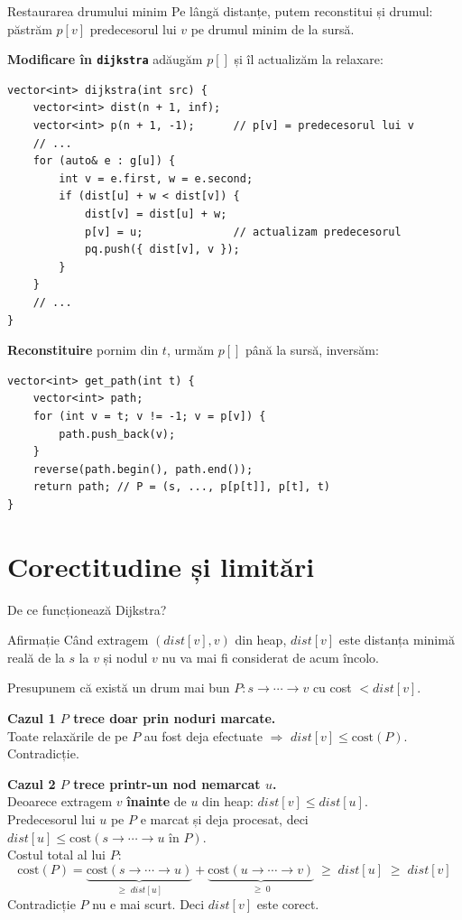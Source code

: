 \documentclass[10pt]{beamer}
\begin{document}
\begin{frame}[fragile, shrink=10]{Restaurarea drumului minim}
  Pe lângă distanțe, putem reconstitui și drumul: păstrăm \textbf{$p[v]$}
  \textemdash{} predecesorul lui $v$ pe drumul minim de la sursă.

  \textbf{Modificare în \texttt{dijkstra}} \textemdash{} adăugăm $p[]$ și îl actualizăm la relaxare:
\begin{lstlisting}
vector<int> dijkstra(int src) {
    vector<int> dist(n + 1, inf);
    vector<int> p(n + 1, -1);      // p[v] = predecesorul lui v
    // ...
    for (auto& e : g[u]) {
        int v = e.first, w = e.second;
        if (dist[u] + w < dist[v]) {
            dist[v] = dist[u] + w;
            p[v] = u;              // actualizam predecesorul
            pq.push({ dist[v], v });
        }
    }
    // ...
}
\end{lstlisting}

\textbf{Reconstituire} \textemdash{} pornim din $t$, urmăm $p[]$ până la sursă, inversăm:
\begin{lstlisting}
vector<int> get_path(int t) {
    vector<int> path;
    for (int v = t; v != -1; v = p[v]) {
        path.push_back(v);
    }
    reverse(path.begin(), path.end());
    return path; // P = (s, ..., p[p[t]], p[t], t)
}
\end{lstlisting}
\end{frame}


\section{Corectitudine și limitări}

\begin{frame}[shrink]{De ce funcționează Dijkstra?}
  \begin{block}{Afirmație}
    Când extragem $(dist[v], v)$ din heap, $dist[v]$ este distanța minimă reală de la $s$ la $v$ și nodul $v$ nu va mai fi considerat de acum încolo.
  \end{block}

  Presupunem că există un drum mai bun $P: s \to \cdots \to v$ cu cost $< dist[v]$.

  \smallskip
  \textbf{Cazul 1 \textemdash{} $P$ trece doar prin noduri marcate.}\\
  Toate relaxările de pe $P$ au fost deja efectuate $\Rightarrow$ $dist[v] \leq \text{cost}(P)$.
  Contradicție.

  \smallskip
  \textbf{Cazul 2 \textemdash{} $P$ trece printr-un nod nemarcat $u$.}\\
  Deoarece extragem $v$ \textbf{înainte} de $u$ din heap: $dist[v] \leq dist[u]$.\\
  Predecesorul lui $u$ pe $P$ e marcat și deja procesat, deci $dist[u] \leq \text{cost}(s \to \cdots \to u \text{ în } P)$.\\
  Costul total al lui $P$:
  \[
    \text{cost}(P)
    = \underbrace{\text{cost}(s \to \cdots \to u)}_{\geq\; dist[u]}
    + \underbrace{\text{cost}(u \to \cdots \to v)}_{\geq\; 0}
    \;\geq\; dist[u] \;\geq\; dist[v]
  \]
  Contradicție \textemdash{} $P$ nu e mai scurt. Deci $dist[v]$ este corect. \checkmark
\end{frame}
\end{document}
